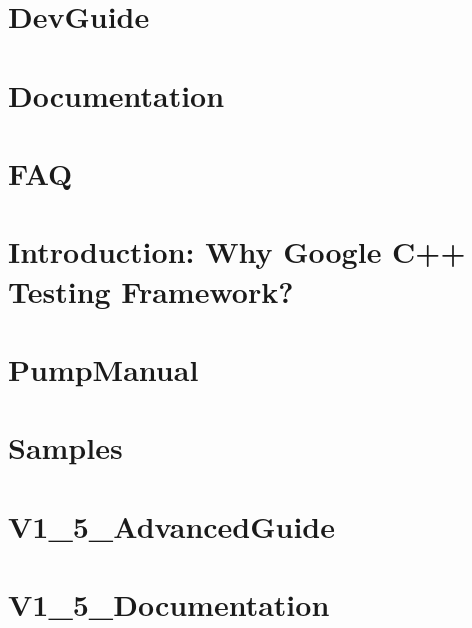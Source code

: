 \documentclass[twoside]{book}
\newcommand{\+}{\discretionary{\mbox{\scriptsize$\hookleftarrow$}}{}{}}
\begin{document}
\chapter{Dev\+Guide}
\label{md_vendor_googletest_googletest_docs_DevGuide}

\chapter{Documentation}
\label{md_vendor_googletest_googletest_docs_Documentation}

\chapter{FAQ}
\label{md_vendor_googletest_googletest_docs_FAQ}

\chapter{Introduction\+: Why Google C++ Testing Framework?}
\label{md_vendor_googletest_googletest_docs_Primer}

\chapter{Pump\+Manual}
\label{md_vendor_googletest_googletest_docs_PumpManual}

\chapter{Samples}
\label{md_vendor_googletest_googletest_docs_Samples}

\chapter{V1\+\_\+5\+\_\+\+Advanced\+Guide}
\label{md_vendor_googletest_googletest_docs_V1_5_AdvancedGuide}

\chapter{V1\+\_\+5\+\_\+\+Documentation}
\label{md_vendor_googletest_googletest_docs_V1_5_Documentation}

\end{document}

